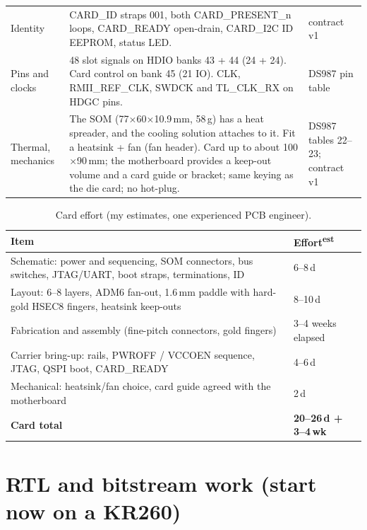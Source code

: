 \documentclass[10pt,a4paper]{article}
\newcommand\est{\textcolor{amber}{\textsuperscript{est}}}
\begin{document}
\begin{table}[H]
\begin{tabularx}{\textwidth}{@{}P{2.8cm}LP{2.2cm}@{}}
Identity & CARD\_ID straps 001, both CARD\_PRESENT\_n loops, CARD\_READY open-drain, CARD\_I2C ID EEPROM, status LED. & contract v1\\
Pins and clocks & 48 slot signals on HDIO banks 43 + 44 (24 + 24). Card control on bank 45 (21 IO). CLK, RMII\_REF\_CLK, SWDCK and TL\_CLK\_RX on HDGC pins. & DS987 pin table\\
Thermal, mechanics & The SOM (77$\times$60$\times$10.9\,mm, 58\,g) has a heat spreader, and the cooling solution attaches to it. Fit a heatsink + fan (fan header). Card up to about 100$\times$90\,mm; the motherboard provides a keep-out volume and a card guide or bracket; same keying as the die card; no hot-plug. & DS987 tables 22--23; contract v1\\
\bottomrule
\end{tabularx}
\end{table}

\begin{table}[H]\centering\footnotesize
\caption{Card effort (my estimates, one experienced PCB engineer).}
\begin{tabularx}{\textwidth}{@{}LP{3.2cm}@{}}
\toprule
{}Item & Effort\est\\
\midrule
Schematic: power and sequencing, SOM connectors, bus switches, JTAG/UART, boot straps, terminations, ID & 6--8\,d\\
Layout: 6--8 layers, ADM6 fan-out, 1.6\,mm paddle with hard-gold HSEC8 fingers, heatsink keep-outs & 8--10\,d\\
Fabrication and assembly (fine-pitch connectors, gold fingers) & 3--4 weeks elapsed\\
Carrier bring-up: rails, PWROFF / VCCOEN sequence, JTAG, QSPI boot, CARD\_READY & 4--6\,d\\
Mechanical: heatsink/fan choice, card guide agreed with the motherboard & 2\,d\\
\textbf{Card total} & \textbf{20--26\,d + 3--4\,wk}\\
\bottomrule
\end{tabularx}
\end{table}

\section{RTL and bitstream work (start now on a KR260)}
\end{document}
